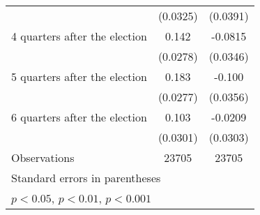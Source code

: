 \begin{table}[htbp]
\begin{tabular}{l*{2}{c}}
                    &    (0.0325)         &    (0.0391)         \\
[1em]
 4 quarters after the election&       0.142\sym{***}&     -0.0815\sym{*}  \\
                    &    (0.0278)         &    (0.0346)         \\
[1em]
 5 quarters after the election&       0.183\sym{***}&      -0.100\sym{**} \\
                    &    (0.0277)         &    (0.0356)         \\
[1em]
 6 quarters after the election&       0.103\sym{***}&     -0.0209         \\
                    &    (0.0301)         &    (0.0303)         \\
\hline
Observations        &       23705         &       23705         \\
\hline\hline
\multicolumn{3}{l}{\footnotesize Standard errors in parentheses}\\
\multicolumn{3}{l}{\footnotesize \sym{*} \(p<0.05\), \sym{**} \(p<0.01\), \sym{***} \(p<0.001\)}\\
\end{tabular}
\end{table}
